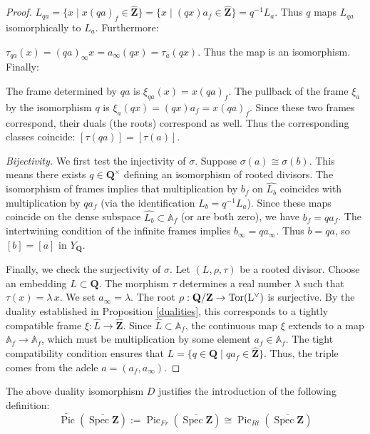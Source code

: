 \documentclass[11pt,a4paper]{article}
\newcommand{\Q}{\mathbf{Q}}
\newcommand{\Z}{\mathbf{Z}}
\newcommand{\Af}{\mathbb{A}_f}
\def\spzb{\overline{\Spec \Z}}
\newcommand{\Spec}{\operatorname{Spec}}
\def\Pic{\operatorname{Pic}}
\def\tspz{\widetilde{\Pic}(\spzb)}
\def\MFr{\operatorname{Pic}_{Fr}}
\def\MRt{\operatorname{Pic}_{Rt}}
\theoremstyle{plain}
\theoremstyle{definition} %
\begin{document}
\begin{proof}
$L_{qa} = \{x \mid x(qa)_f \in \widehat{\Z}\} = \{x \mid (qx)a_f \in \widehat{\Z}\} = q^{-1} L_a$. Thus $q$ maps $L_{qa}$ isomorphically to $L_a$. Furthermore:\vspace{.02in}

$\tau_{qa}(x) = (qa)_\infty x = a_\infty (qx) = \tau_a(qx)$. Thus the map is an isomorphism. Finally:\vspace{.02in}
 
The frame determined by $qa$ is $\xi_{qa}(x) = x(qa)_f$. The pullback of the frame $\xi_a$ by the isomorphism $q$ is $\xi_a(qx) = (qx)a_f = x(qa)_f$. Since these two frames correspond, their duals (the roots) correspond as well.
Thus the corresponding classes  coincide: $[\tau(qa)] = [\tau(a)]$.\vspace{.03in}

\emph{Bijectivity.}
We first test the injectivity of $\sigma$. Suppose $\sigma(a) \cong \sigma(b)$. This means there exists $q \in \Q^\times$ defining an isomorphism of rooted divisors.
The isomorphism of frames implies that multiplication by $b_f$ on $\widehat{L_b}$ coincides with multiplication by $q a_f$ (via the identification $L_b = q^{-1} L_a$). Since these maps coincide on the dense subspace $\widehat{L_b} \subset \Af$ (or are both zero), we have $b_f = q a_f$.
The intertwining  condition of the infinite frames implies $b_\infty = q a_\infty$.
Thus $b = q a$, so $[b] = [a]$ in $Y_\Q$.

Finally, we check the surjectivity of $\sigma$.  Let $(L, \rho, \tau)$ be a rooted divisor.
Choose an embedding $L \subset \Q$.
The morphism $\tau$ determines a real number $\lambda $ such that $\tau(x) = \lambda\, x$. We set $a_\infty = \lambda$.
The root $\rho: \Q/\Z \to \rm{Tor}(L^\vee)$ is surjective. By the duality established in Proposition \ref{dualities}, this corresponds to a tightly compatible frame $\xi: \widehat{L} \to \widehat{\Z}$.
Since $\widehat{L} \subset \Af$, the continuous map $\xi$ extends to a map $\Af \to \Af$, which must be multiplication by some element $a_f \in \Af$.
The tight compatibility condition ensures that $L = \{ q \in \Q \mid q a_f \in \widehat{\Z} \}$.
Thus, the triple comes from the adele $a = (a_f, a_\infty)$.
\fi
\end{proof}

The above duality isomorphism $D$ justifies the introduction of the following definition:
\begin{equation}\label{}
\tspz := \MFr(\spzb) \cong \MRt(\spzb)
\end{equation}
\end{document}
